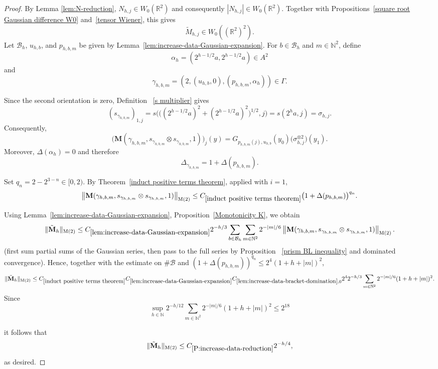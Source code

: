 \documentclass[12pt,reqno]{amsart}
\theoremstyle{plain}
\numberwithin{equation}{section}
\theoremstyle{remark}
\newcommand{\N}{{\mathbb N}}
\newcommand{\M}{\mathbf{M}}
\begin{document}
\begin{proof}
By Lemma \ref{lem:N-reduction}, \(N_{h,j}\in W_0(\mathbb R^2)\) and consequently $|N_{h,j}|\in W_0(\mathbb R^2)$. Together with Propositions~\ref{square root Gaussian difference W0}
and~\ref{tensor Wiener}, this gives
\[
\tilde M_{h,j}\in W_0((\mathbb R^2)^2).
\]
Let \(\mathcal B_h\), \(u_{h,b}\), and \(p_{h,b,m}\) be given by
Lemma~\ref{lem:increase-data-Gaussian-expansion}. For
\(b\in\mathcal B_h\) and \(m\in\mathbb N^2\), define
\[
\alpha_h
=
\left(
2^{h-1/2}a,
2^{h-1/2}a
\right)\in A^2
\]
and
\[
\gamma_{h,b,m}
=
\left(
2,
(u_{h,b},0),
(p_{h,b,m},\alpha_h)
\right)\in\Gamma.
\]

Since the second orientation is zero, Definition~
\ref{s multiplier} gives
\[
(s_{\gamma_{h,b,m}})_{1,j}
=
s\Big(
\big(
(2^{h-1/2}a)^2+
(2^{h-1/2}a)^2
\big )^{1/2},
j
\Big)
=
s(2^ha,j)
=
\sigma_{h,j}.
\]
Consequently,
\begin{equation}
    \label{E:increase-data-positive-term-recognition}
    \bigl(
    \M(
    \gamma_{h,b,m},
    s_{\gamma_{h,b,m}}\otimes s_{\gamma_{h,b,m}},
    1
    )
    \bigr)_j(y) =
    G_{p_{h,b,m}(j),u_{h,b}}(y_0)
    \bigl(\sigma_{h,j}^{\otimes2}\bigr)(y_1).
\end{equation}
Moreover,
$\Delta(\alpha_h)=0$
and therefore
\[ \Delta_{\gamma_{h,b,m}} =
1+\Delta(p_{h,b,m}). \]

Set $
q_n=2-2^{3-n}\in[0,2).$
By Theorem~\ref{induct positive terms theorem}, applied with
\(i=1\),
\[
\left\|
\M(
\gamma_{h,b,m},
s_{\gamma_{h,b,m}}\otimes s_{\gamma_{h,b,m}},
1
)
\right\|_{\mathrm M(2)}
 \leq
C_{\ref{induct positive terms theorem}}
\bigl(
1+\Delta(p_{h,b,m})
\bigr)^{q_n}.
\]

Using Lemma~\ref{lem:increase-data-Gaussian-expansion},
Proposition~\ref{Monotonicity K}, we obtain
\[
\|\tilde{\mathbf M}_h\|_{\mathrm M(2)}
\leq
C_{\ref{lem:increase-data-Gaussian-expansion}}
2^{-h/3}
\sum_{b\in\mathcal B_h}
\sum_{m\in\mathbb N^2}
2^{-|m|/6}
\left\|
\M(
\gamma_{h,b,m},
s_{\gamma_{h,b,m}}\otimes s_{\gamma_{h,b,m}},
1
)
\right\|_{\mathrm M(2)}.
\]
(first sum partial
sums of the Gaussian series, then pass to the full series by Proposition~
\ref{prism BL inequality} and dominated convergence). Hence, together with the estimate on $\#\mathcal{B}$ and $(1+\Delta(p_{h,b,m}))^{q_n}\le 2^{4}(1+h+|m|)^2$,
\[
\|\tilde{\mathbf M}_h\|_{\mathrm M(2)}
\leq
C_{\ref{induct positive terms theorem}}C_{\ref{lem:increase-data-Gaussian-expansion}}C_{\ref{lem:increase-data-bracket-domination},0}2^4
2^{-h/3}
\sum_{m\in\mathbb N^2}
2^{-|m|/6}
(1+h+|m|)^{2}.
\]
Since
\[\sup_{h\in \N}2^{-h/12}\sum_{m\in \N^2}2^{-|m|/6}(1+h+|m|)^2\le 2^{18}\]


it follows that
\[
\|\tilde{\mathbf M}_h\|_{\mathrm M(2)}
\leq
C_{\ref{P:increase-data-reduction}}2^{-h/4},
\]
as desired.
\end{proof}
\end{document}
